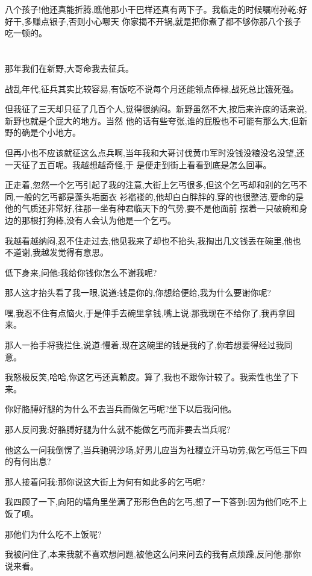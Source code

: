 ﻿\documentclass[12pt,twocolumn]{article}
\begin{document}
八个孩子!他还真能折腾,瞧他那小干巴样还真有两下子。我临走的时候嘱咐孙乾:好好干,多赚点银子,否则小心哪天
你家揭不开锅,就是把你煮了都不够你那八个孩子吃一顿的。

\section{}

那年我们在新野,大哥命我去征兵。

战乱年代,征兵其实比较容易,有饭吃不说每个月还能领点俸禄,战死总比饿死强。

但我征了三天却只征了几百个人,觉得很纳闷。新野虽然不大,按后来许庶的话来说,新野也就是个屁大的地方。当然
他的话有些夸张,谁的屁股也不可能有那么大,但新野的确是个小地方。

但再小也不应该就征这么点兵啊,当年我和大哥讨伐黄巾军时没钱没粮没名没望,还一天征了五百呢。我越想越奇怪,于
是便走到街上看看到底是怎么回事。

正走着,忽然一个乞丐引起了我的注意,大街上乞丐很多,但这个乞丐却和别的乞丐不同,一般的乞丐都是蓬头垢面衣
衫褴褛的,他却白白胖胖的,穿的也很整洁,要命的是他的气质还非常好,往那一坐有种君临天下的气势,要不是他面前
摆着一只破碗和身边的那根打狗棒,没有人会认为他是一个乞丐。

我越看越纳闷,忍不住走过去,他见我来了却也不抬头,我掏出几文钱丢在碗里,他也不道谢,我越发觉得有意思。

低下身来,问他:我给你钱你怎么不谢我呢?

那人这才抬头看了我一眼,说道:钱是你的,你想给便给,我为什么要谢你呢?

嘿,我忍不住有点恼火,于是伸手去碗里拿钱,嘴上说:那我现在不给你了,我再拿回来。

那人一抬手将我拦住,说道:慢着,现在这碗里的钱是我的了,你若想要得经过我同意。

我怒极反笑,哈哈,你这乞丐还真赖皮。算了,我也不跟你计较了。我索性也坐了下来。

你好胳膊好腿的为什么不去当兵而做乞丐呢?坐下以后我问他。

那人反问我:好胳膊好腿为什么就不能做乞丐而非要去当兵呢?

他这么一问我倒愣了,当兵驰骋沙场,好男儿应当为社稷立汗马功劳,做乞丐低三下四的有何出息?

那人接着问我:那你说这大街上为何有如此多的乞丐呢?

我四顾了一下,向阳的墙角里坐满了形形色色的乞丐,想了一下答到:因为他们吃不上饭了呗。

那他们为什么吃不上饭呢?

我被问住了,本来我就不喜欢想问题,被他这么问来问去的我有点烦躁,反问他:那你说来看。
\end{document}
